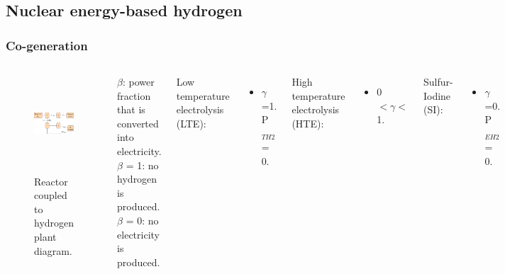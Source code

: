 \subsection{Nuclear energy-based hydrogen}
\begin{frame}
\frametitle{Co-generation}
\begin{columns}
    \column[t]{6.5cm}
   	\begin{figure}[htbp!]
		\begin{center}
			\includegraphics[height=3.6cm]{images/hte-figure0.png}
		\end{center}
		\caption{Reactor coupled to hydrogen plant diagram.}
 	\end{figure}

 	\column[t]{3.5cm}
 	$\beta$: power fraction that is converted into electricity.
 	\\
    $\beta$ = 1: no hydrogen is produced.
    \\
 	$\beta$ = 0: no electricity is produced. \vspace{0.6cm}

 	Low temperature electrolysis (LTE):
 	\begin{itemize}
 		\item $\gamma$=1. P$_{TH2}$ = 0.
 	\end{itemize}

 	High temperature electrolysis (HTE):
 	\begin{itemize}
 		\item 0 $< \gamma <$ 1.
 	\end{itemize}

    Sulfur-Iodine (SI):
 	\begin{itemize}
 		\item $\gamma$=0. P$_{EH2}$ = 0.
 	\end{itemize}
\end{columns}
\end{frame}
